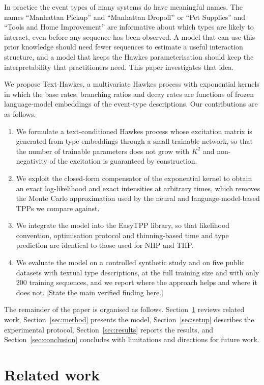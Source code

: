 \documentclass[preprint,12pt,authoryear]{elsarticle}
\newcommand{\todo}[1]{{\color{red}[#1]}}
\begin{document}
In practice the event types of many systems do have meaningful names. The names ``Manhattan Pickup'' and ``Manhattan Dropoff'' or ``Pet Supplies'' and ``Tools and Home Improvement'' are informative about which types are likely to interact, even before any sequence has been observed. A model that can use this prior knowledge should need fewer sequences to estimate a useful interaction structure, and a model that keeps the Hawkes parameterisation should keep the interpretability that practitioners need. This paper investigates that idea.

We propose Text-Hawkes, a multivariate Hawkes process with exponential kernels in which the base rates, branching ratios and decay rates are functions of frozen language-model embeddings of the event-type descriptions. Our contributions are as follows.
\begin{enumerate}
\item We formulate a text-conditioned Hawkes process whose excitation matrix is generated from type embeddings through a small trainable network, so that the number of trainable parameters does not grow with $K^2$ and non-negativity of the excitation is guaranteed by construction.
\item We exploit the closed-form compensator of the exponential kernel to obtain an exact log-likelihood and exact intensities at arbitrary times, which removes the Monte Carlo approximation used by the neural and language-model-based TPPs we compare against.
\item We integrate the model into the EasyTPP library, so that likelihood convention, optimisation protocol and thinning-based time and type prediction are identical to those used for NHP and THP.
\item We evaluate the model on a controlled synthetic study and on five public datasets with textual type descriptions, at the full training size and with only 200 training sequences, and we report where the approach helps and where it does not. \todo{State the main verified finding here.}
\end{enumerate}

The remainder of the paper is organised as follows. Section~\ref{sec:related} reviews related work, Section~\ref{sec:method} presents the model, Section~\ref{sec:setup} describes the experimental protocol, Section~\ref{sec:results} reports the results, and Section~\ref{sec:conclusion} concludes with limitations and directions for future work.

\section{Related work}
\label{sec:related}
\end{document}
